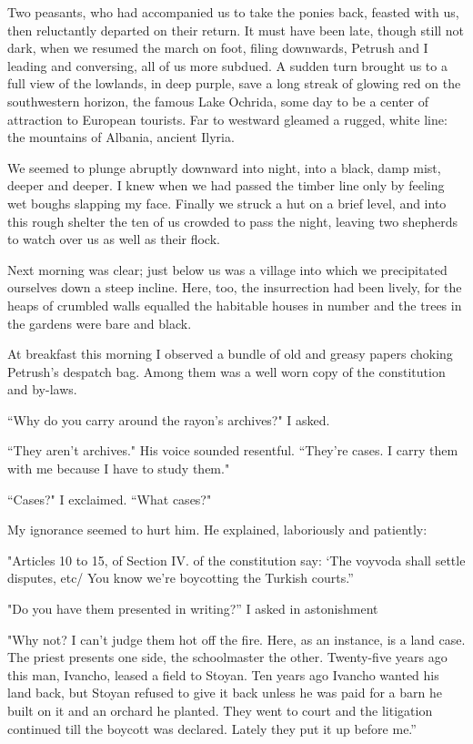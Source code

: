 \documentclass[a5paper,12pt]{book}
\begin{document}
Two peasants, who had accompanied us to take the ponies back, feasted with us, then reluctantly departed on their return. It must have been late, though still not dark, when we resumed the march on foot, filing downwards, Petrush and I leading and conversing, all of us more subdued. A sudden turn brought us to a full view of the lowlands, in deep purple, save a long streak of glowing red on the southwestern horizon, the famous Lake Ochrida, some day to be a center of attraction to European tourists. Far to westward gleamed a rugged, white line: the mountains of Albania, ancient Ilyria.

We seemed to plunge abruptly downward into night, into a black, damp mist, deeper and deeper. I knew when we had passed the timber line only by feeling wet boughs slapping my face. Finally we struck a hut on a brief level, and into this rough shelter the ten of us crowded to pass the night, leaving two shepherds to watch over us as well as their flock.

Next morning was clear; just below us was a village into which we precipitated ourselves down a steep incline. Here, too, the insurrection had been lively, for the heaps of crumbled walls equalled the habitable houses in number and the trees in the gardens were bare and black.

At breakfast this morning I observed a bundle of old and greasy papers choking Petrush’s despatch bag. Among them was a well worn copy of the constitution and by-laws.

“Why do you carry around the rayon's archives?" I asked.

“They aren’t archives." His voice sounded resentful. “They’re cases. I carry them with me because I have to study them."

“Cases?" I exclaimed. “What cases?"

My ignorance seemed to hurt him. He explained, laboriously and patiently:

"Articles 10 to 15, of Section IV. of the constitution say: ‘The voyvoda shall settle disputes, etc/ You know we're boycotting the Turkish courts.”

"Do you have them presented in writing?” I asked in astonishment

"Why not? I can’t judge them hot off the fire. Here, as an instance, is a land case. The priest presents one side, the schoolmaster the other. Twenty-five years ago this man, Ivancho, leased a field to Stoyan. Ten years ago Ivancho wanted his land back, but Stoyan refused to give it back unless he was paid for a barn he built on it and an orchard he planted. They went to court and the litigation continued till the boycott was declared. Lately they put it up before me.”
\end{document}
